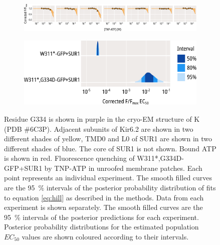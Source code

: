 \begin{figure}[h]
\begin{subfigure}[t]{0.45\textwidth}
	\end{subfigure}
	\vfill
	\begin{subfigure}[t]{0.9\textwidth}
		\caption{}\label{ch5fig:g334d_indfits}
		\centering
		\includegraphics[width=\textwidth]{g334d_3.pdf}
	\end{subfigure}
	\vfill
	\begin{subfigure}[t]{0.7\textwidth}
		\caption{}\label{ch5fig:g334d_params}
		\centering
		\includegraphics[width=\textwidth]{g334d_4.pdf}
	\end{subfigure}
	\caption[G334D abolishes nucleotide binding at Kir6.2]{
	 Residue G334 is shown in purple in the cryo-EM structure of K\ATP{} (PDB \#6C3P).
	Adjacent subunits of Kir6.2 are shown in two different shades of yellow, TMD0 and L0 of SUR1 are shown in two different shades of blue.
	The core of SUR1 is not shown.
	Bound ATP is shown in red.
	 Fluorescence quenching of W311*,G334D-GFP+SUR1 by TNP-ATP in unroofed membrane patches.
	Each point represents an individual experiment.
	The smooth filled curves are the \SI{95}{\percent} intervals of the posterior probability distribution of fits to equation \ref{eq:hill} as described in the methods.
	 Data from each experiment is shown separately.
	The smooth filled curves are the \SI{95}{\percent} intervals of the posterior predictions for each experiment.
	 Posterior probability distributions for the estimated population $EC_{50}$ values are shown coloured according to their intervals.
	}\label{ch5fig:g334d}
\end{figure}

